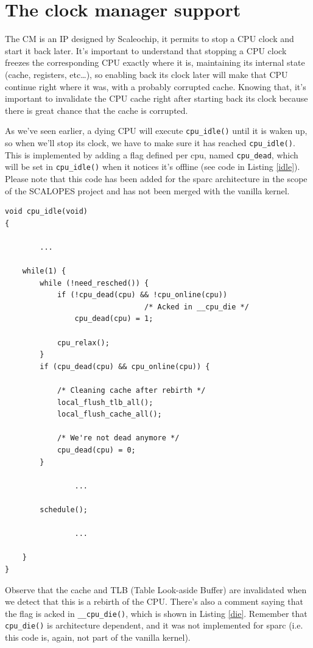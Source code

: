 \documentclass{report}
\renewcommand{\tt}[1]{\texttt{{{#1}}}}
\begin{document}
\section{The clock manager support}

The CM is an IP designed by Scaleochip, it permits to stop a CPU clock and
start it back later. It's important to understand that stopping a CPU clock
freezes the corresponding CPU exactly where it is, maintaining its internal
state (cache, registers, etc\ldots), so enabling back its clock later will make
that CPU continue right where it was, with a probably corrupted cache. Knowing
that, it's important to invalidate the CPU cache right after starting back its
clock because there is great chance that the cache is corrupted.

As we've seen earlier, a dying CPU will execute \tt{cpu\_idle()} until it is
waken up, so when we'll stop its clock, we have to make sure it has reached
\tt{cpu\_idle()}. This is implemented by adding a flag defined per cpu, named
\tt{cpu\_dead}, which will be set in \tt{cpu\_idle()} when it notices it's
offline (see code in Listing \ref{idle}). Please note that this code has been
added for the sparc architecture in the scope of the SCALOPES project and has
not been merged with the vanilla kernel.

\begin{lstlisting}[caption=\tt{cpu\_idle()}{{,}} \tt{arch/sparc/process.c},label=idle]
void cpu_idle(void)
{

        ...

	while(1) {
		while (!need_resched()) {
			if (!cpu_dead(cpu) && !cpu_online(cpu))
                                /* Acked in __cpu_die */
				cpu_dead(cpu) = 1;

			cpu_relax();
		}
		if (cpu_dead(cpu) && cpu_online(cpu)) {

			/* Cleaning cache after rebirth */
			local_flush_tlb_all();
			local_flush_cache_all();

			/* We're not dead anymore */
			cpu_dead(cpu) = 0;
		}

                ...

		schedule();

                ...

	}
}
\end{lstlisting}

Observe that the cache and TLB (Table Look-aside Buffer) are invalidated when
we detect that this is a rebirth of the CPU. There's also a comment saying that
the flag is acked in \tt{\_\_cpu\_die()}, which is shown in Listing
\ref{die}. Remember that \tt{cpu\_die()} is architecture dependent, and it was
not implemented for sparc (i.e. this code is, again, not part of the vanilla
kernel).
\end{document}
